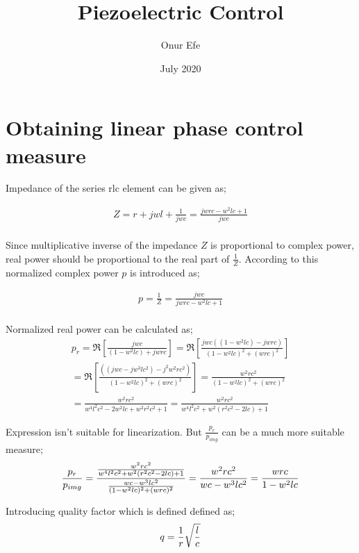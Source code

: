 \documentclass{article}
\title{Piezoelectric Control}
\author{Onur Efe}
\date{July 2020}
\begin{document}
\maketitle

\section{Obtaining linear phase control measure}
Impedance of the series rlc element can be given as;

\begin{multline}
    Z = r + jwl + \frac{1}{jwc}
    = \frac{jwrc - w^2lc + 1}{jwc} \\
\end{multline}

Since multiplicative inverse of the impedance $Z$ is proportional to complex power, real power should be proportional to the real part of $\frac{1}{Z}$. According to this normalized complex power $p$ is introduced as;

\begin{multline}
    p = \frac{1}{Z} = \frac{jwc}{jwrc - w^2lc + 1} \\
\end{multline}

Normalized real power can be calculated as;
\begin{multline}
    p_{r} = \Re{\left[\frac{jwc}{(1-w^2lc) + jwrc} \right]}
    = \Re{\left[\frac{jwc((1-w^2lc) - jwrc)}{(1-w^2lc)^2 + (wrc)^2} \right]} \\
    = \Re{\left[\frac{((jwc-jw^3lc^2) - j^2w^2rc^2)}{(1-w^2lc)^2 + (wrc)^2} \right]}
    = \frac{w^2rc^2}{(1-w^2lc)^2 + (wrc)^2} \\
    = \frac{w^2rc^2}{w^4l^2c^2 - 2w^2lc + w^2r^2c^2 + 1} = \frac{w^2rc^2}{w^4l^2c^2 + w^2(r^2c^2 - 2lc) + 1}
\end{multline}

Expression isn't suitable for linearization. But $\frac{p_r}{p_{img}}$ can be a much more suitable measure;
\begin{multline}{\label{temp:1}}
    \frac{p_r}{p_{img}} = \frac{\frac{w^2rc^2}{w^4l^2c^2 + w^2(r^2c^2 - 2lc) + 1}}{\frac{wc-w^3lc^2}{(1-w^2lc)^2 + (wrc)^2}}
    = \frac{w^2rc^2}{wc-w^3lc^2} = \frac{wrc}{1-w^2lc}
\end{multline}

Introducing quality factor which is defined defined as;
\begin{equation}{\label{def:qualityfactor}}
    q = \frac{1}{r} \sqrt{\frac{l}{c}}
\end{equation}
\end{document}
